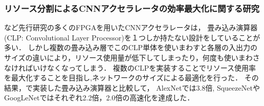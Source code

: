 {\subsubsection{リソース分割によるCNNアクセラレータの効率最大化に関する研究\cite{max}}
\cite{optimized}など先行研究の多くのFPGAを用いたCNNアクセラレータは，
畳み込み演算器(CLP: Convolutional Layer Processor)を１つしか持たない設計をしていることが多い．
しかし複数の畳み込み層でこのCLP単体を使いまわすと各層の入出力のサイズの違いにより，リソース使用量が低下してしまったり，何度も使いまわさなければいけなくなってしまう．
複数のCLPを実装することでリソース使用率を最大化することを目指し,ネットワークのサイズによる最適化を行った．
その結果，\cite{optimized}で実装した畳み込み演算器と比較して，
AlexNet\cite{alexnet}では3.8倍, SqueezeNet\cite{squeezenet}やGoogLeNet\cite{googlenet}ではそれぞれ2.2倍，2.0倍の高速化を達成した．
}
